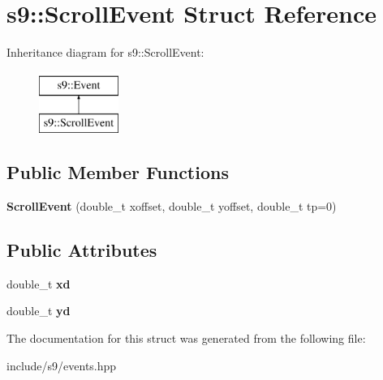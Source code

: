 \hypertarget{structs9_1_1ScrollEvent}{\section{s9\-:\-:Scroll\-Event Struct Reference}
\label{structs9_1_1ScrollEvent}
}
Inheritance diagram for s9\-:\-:Scroll\-Event\-:\begin{figure}[H]
\begin{center}
\leavevmode
\includegraphics[height=2.000000cm]{structs9_1_1ScrollEvent}
\end{center}
\end{figure}
\subsection*{Public Member Functions}
\begin{DoxyCompactItemize}
\item 
\hypertarget{structs9_1_1ScrollEvent_ae2ff405583c9c4075f527e808010ba1d}{{\bfseries Scroll\-Event} (double\-\_\-t xoffset, double\-\_\-t yoffset, double\-\_\-t tp=0)}\label{structs9_1_1ScrollEvent_ae2ff405583c9c4075f527e808010ba1d}

\end{DoxyCompactItemize}
\subsection*{Public Attributes}
\begin{DoxyCompactItemize}
\item 
\hypertarget{structs9_1_1ScrollEvent_a80ecdcca53e776f2314cfdf903a40af7}{double\-\_\-t {\bfseries xd}}\label{structs9_1_1ScrollEvent_a80ecdcca53e776f2314cfdf903a40af7}

\item 
\hypertarget{structs9_1_1ScrollEvent_aadd801ed8c3da29c8504c63953cb7b9f}{double\-\_\-t {\bfseries yd}}\label{structs9_1_1ScrollEvent_aadd801ed8c3da29c8504c63953cb7b9f}

\end{DoxyCompactItemize}


The documentation for this struct was generated from the following file\-:\begin{DoxyCompactItemize}
\item 
include/s9/events.\-hpp\end{DoxyCompactItemize}
